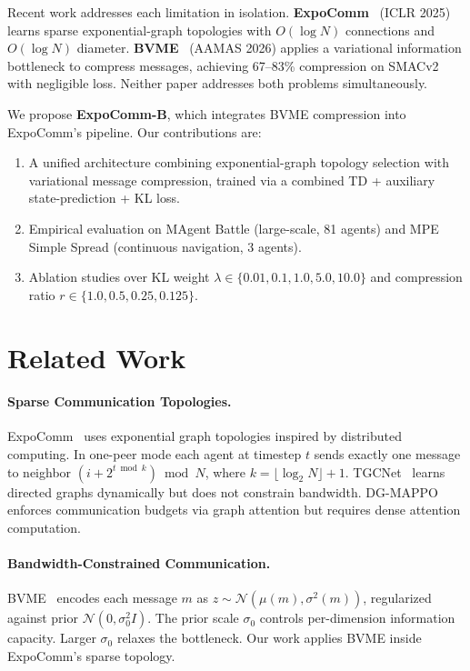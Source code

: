 \documentclass{article}
\begin{document}
Recent work addresses each limitation in isolation. \textbf{ExpoComm}~\cite{expocomm} (ICLR 2025) learns sparse exponential-graph topologies with $O(\log N)$ connections and $O(\log N)$ diameter. \textbf{BVME}~\cite{bvme} (AAMAS 2026) applies a variational information bottleneck to compress messages, achieving 67--83\% compression on SMACv2 with negligible loss. Neither paper addresses both problems simultaneously.

We propose \textbf{ExpoComm-B}, which integrates BVME compression into ExpoComm's pipeline. Our contributions are:
\begin{enumerate}[noitemsep,topsep=2pt]
\item A unified architecture combining exponential-graph topology selection with variational message compression, trained via a combined TD + auxiliary state-prediction + KL loss.
\item Empirical evaluation on MAgent Battle (large-scale, 81 agents) and MPE Simple Spread (continuous navigation, 3 agents).
\item Ablation studies over KL weight $\lambda \in \{0.01,0.1,1.0,5.0,10.0\}$ and compression ratio $r \in \{1.0, 0.5, 0.25, 0.125\}$.
\end{enumerate}

\section{Related Work}
\label{sec:related}

\paragraph{Sparse Communication Topologies.}
ExpoComm~\cite{expocomm} uses exponential graph topologies inspired by distributed computing. In one-peer mode each agent at timestep $t$ sends exactly one message to neighbor $(i + 2^{t \bmod k}) \bmod N$, where $k = \lfloor\log_2 N\rfloor + 1$. TGCNet~\cite{tgcnet} learns directed graphs dynamically but does not constrain bandwidth. DG-MAPPO~\cite{dgmappo} enforces communication budgets via graph attention but requires dense attention computation.

\paragraph{Bandwidth-Constrained Communication.}
BVME~\cite{bvme} encodes each message $m$ as $z \sim \mathcal{N}(\mu(m), \sigma^2(m))$, regularized against prior $\mathcal{N}(0,\sigma_0^2 I)$. The prior scale $\sigma_0$ controls per-dimension information capacity. Larger $\sigma_0$ relaxes the bottleneck. Our work applies BVME inside ExpoComm's sparse topology.
\end{document}
